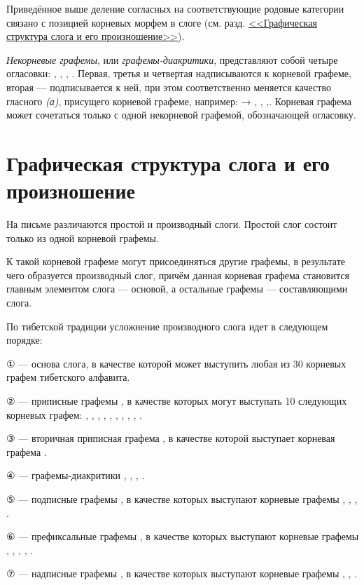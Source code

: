 Приведённое выше деление согласных на соответствующие родовые категории связано с позицией корневых морфем в слоге (см. разд. \hyperref[sec:gss]{<<Графическая структура слога и его произношение>>}).

\emph{Некорневые графемы}, или \emph{графемы-диакритики}, представляют собой четыре огласовки: , , , . Первая, третья и четвертая надписываются к корневой графеме, вторая --- подписывается к ней, при этом соответственно меняется качество гласного \textit{(а)}, присущего корневой графеме, например:  {\unifont →} , , ,. Корневая графема может сочетаться только с одной некорневой графемой, обозначающей огласовку.

\section{Графическая структура слога и его произношение}
\label{sec:gss}

На письме различаются простой и производный слоги. Простой слог состоит только из одной корневой графемы.

К такой корневой графеме могут присоединяться другие графемы, в результате чего образуется производный слог, причём данная корневая графема становится главным элементом слога --- основой, а остальные графемы --- составляющими слога.

По тибетской традиции усложнение производного слога идет в следующем порядке:
\begin{description}
	\item {\unifont ①} --- основа слога, в качестве которой может выступить любая из 30 корневых графем тибетского алфавита.
	\item {\unifont ②} --- приписные графемы , в качестве которых могут выступать 10 следующих корневых графем: , , , , , , , , , .
	\item {\unifont ③} --- вторичная приписная графема , в качестве которой выступает корневая графема .
	\item {\unifont ④} --- графемы-диакритики , , , .
	\item {\unifont ⑤} --- подписные графемы , в качестве которых выступают корневые графемы , , , .
	\item {\unifont ⑥} --- префиксальные графемы , в качестве которых выступают корневые графемы , , , , .
	\item {\unifont ⑦} --- надписные графемы , в качестве которых выступают корневые графемы , , .
\end{description}

